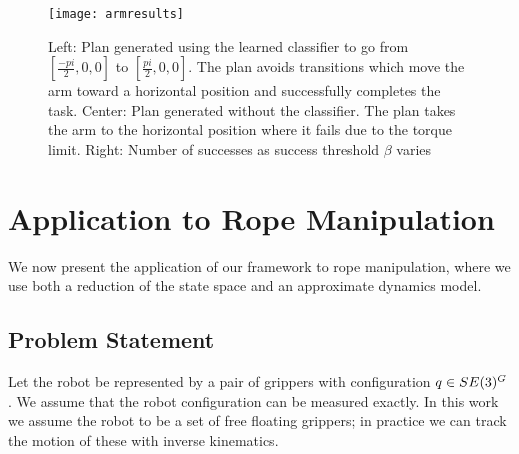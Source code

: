 \begin{figure}[t]
    \vspace{0.02in}
    \centering
    \texttt{[image: armresults]}
    \vspace{-0.1in}
    \caption{Left: Plan generated using the learned classifier to go from $[\frac{-pi}{2}, 0, 0]$ to $[\frac{pi}{2}, 0, 0]$. The plan avoids transitions which move the arm toward a horizontal position and successfully completes the task. Center: Plan generated without the classifier. The plan takes the arm to the horizontal position where it fails due to the torque limit. Right: Number of successes as success threshold $\beta$ varies}
    \label{fig:planar_arm}
\end{figure}







\section{Application to Rope Manipulation}


We now present the application of our framework to rope manipulation, where we use both a reduction of the state space and an approximate dynamics model.


\subsection{Problem Statement}
Let the robot be represented by a pair of grippers with configuration $q \in SE(3)^G$. We assume that the robot configuration can be measured exactly. In this work we assume the robot to be a set of free floating grippers; in practice we can track the motion of these with inverse kinematics.

